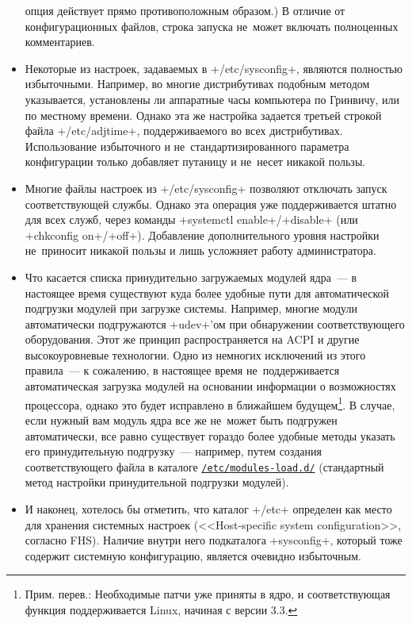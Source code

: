 \documentclass[10pt,oneside,a4paper]{article}
\newcommand{\hreftt}[2]{\href{#1}{\texttt{#2}}}
\begin{document}
\begin{itemize}
		опция действует прямо противоположным образом.) В отличие от
		конфигурационных файлов, строка запуска не~может включать
		полноценных комментариев.
	\item Некоторые из настроек, задаваемых в +/etc/sysconfig+, являются
		полностью избыточными. Например, во многие дистрибутивах
		подобным методом указывается, установлены ли аппаратные часы
		компьютера по Гринвичу, или по местному времени. Однако эта же
		настройка задается третьей строкой файла +/etc/adjtime+,
		поддерживаемого во всех дистрибутивах. Использование
		избыточного и не~стандартизированного параметра конфигурации
		только добавляет путаницу и не~несет никакой пользы.
	\item Многие файлы настроек из +/etc/sysconfig+ позволяют отключать
		запуск соответствующей службы. Однако эта операция уже
		поддерживается штатно для всех служб, через команды
		+systemctl enable+/+disable+ (или +chkconfig on+/+off+).
		Добавление дополнительного уровня настройки не~приносит никакой
		пользы и лишь усложняет работу администратора.
	\item Что касается списка принудительно загружаемых модулей ядра~--- в
		настоящее время существуют куда более удобные пути для
		автоматической подгрузки модулей при загрузке системы. Например,
		многие модули автоматически подгружаются +udev+'ом при
		обнаружении соответствующего оборудования. Этот же принцип
		распространяется на ACPI и другие высокоуровневые технологии.
		Одно из немногих исключений из этого правила~--- к сожалению, в
		настоящее время не~поддерживается автоматическая загрузка
		модулей на основании информации о возможностях процессора,
		однако это будет исправлено в ближайшем будущем\footnote{Прим.
		перев.: Необходимые патчи уже приняты в ядро, и
		соответствующая функция поддерживается Linux, начиная с версии
		3.3.}. В случае, если нужный вам модуль ядра все же не~может
		быть подгружен автоматически, все равно существует гораздо более
		удобные методы указать его принудительную подгрузку~---
		например, путем создания соответствующего файла в каталоге
		\hreftt{http://www.freedesktop.org/software/systemd/man/modules-load.d.html}%
		{/etc/modules-load.d/} (стандартный метод настройки
		принудительной подгрузки модулей).
	\item И наконец, хотелось бы отметить, что каталог +/etc+ определен как
		место для хранения системных настроек (<<Host-specific system
		configuration>>, согласно FHS). Наличие внутри него подкаталога
		+sysconfig+, который тоже содержит системную конфигурацию,
		является очевидно избыточным.
\end{itemize}
\end{document}
